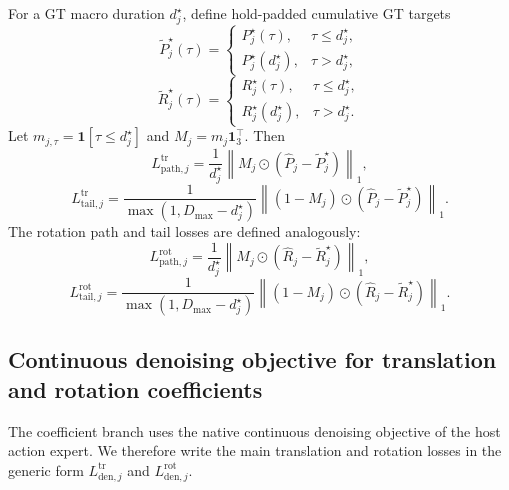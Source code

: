 \documentclass[10pt,twocolumn,letterpaper]{article}
\begin{document}
For a GT macro duration $d_j^{\star}$, define hold-padded cumulative GT targets
\begin{equation}
\widetilde P_j^{\star}(\tau)=
\begin{cases}
P_j^{\star}(\tau), & \tau\le d_j^{\star},\\
P_j^{\star}(d_j^{\star}), & \tau>d_j^{\star},
\end{cases}
\end{equation}
\begin{equation}
\widetilde R_j^{\star}(\tau)=
\begin{cases}
R_j^{\star}(\tau), & \tau\le d_j^{\star},\\
R_j^{\star}(d_j^{\star}), & \tau>d_j^{\star}.
\end{cases}
\end{equation}
Let $m_{j,\tau}=\mathbf{1}[\tau\le d_j^{\star}]$ and $M_j=m_j\mathbf{1}_3^\top$. Then
\begin{equation}
L_{\mathrm{path},j}^{\mathrm{tr}} = \frac{1}{d_j^{\star}}
\left\|M_j\odot(\hat P_j-\widetilde P_j^{\star})\right\|_1,
\end{equation}
\begin{equation}
L_{\mathrm{tail},j}^{\mathrm{tr}} = \frac{1}{\max(1,D_{\max}-d_j^{\star})}
\left\|(1-M_j)\odot(\hat P_j-\widetilde P_j^{\star})\right\|_1.
\end{equation}
The rotation path and tail losses are defined analogously:
\begin{equation}
L_{\mathrm{path},j}^{\mathrm{rot}} = \frac{1}{d_j^{\star}}
\left\|M_j\odot(\hat R_j-\widetilde R_j^{\star})\right\|_1,
\end{equation}
\begin{equation}
L_{\mathrm{tail},j}^{\mathrm{rot}} = \frac{1}{\max(1,D_{\max}-d_j^{\star})}
\left\|(1-M_j)\odot(\hat R_j-\widetilde R_j^{\star})\right\|_1.
\end{equation}

\subsection{Continuous denoising objective for translation and rotation coefficients}
The coefficient branch uses the native continuous denoising objective of the host action expert. We therefore write the main translation and rotation losses in the generic form $L_{\mathrm{den},j}^{\mathrm{tr}}$ and $L_{\mathrm{den},j}^{\mathrm{rot}}$.
\end{document}
